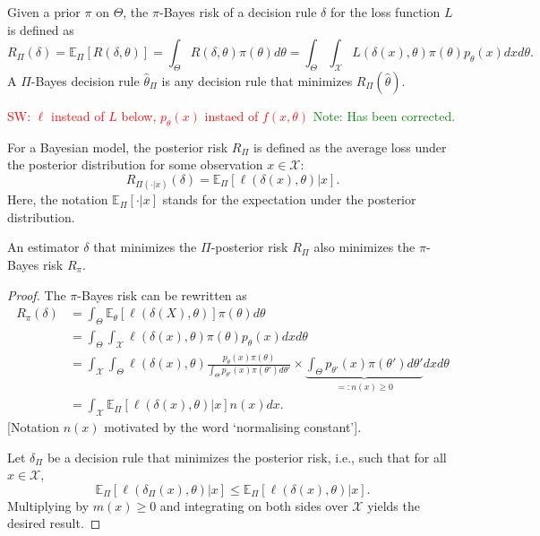 \documentclass[open=any, 11pt,paper=A4]{scrreprt}
\begin{document}
\begin{definition}
    Given a prior $\pi$ on $\Theta$, the $\pi$-Bayes risk of a decision rule $\delta$ for the loss function $L$ is defined as
    \[
    R_\Pi(\delta) = \mathbb{E}_\Pi [R(\delta, \theta)] = \int_{\Theta} R(\delta, \theta) \pi(\theta) d\theta = \int_{\Theta} \int_{\mathcal{X}} L(\delta(x), \theta) \pi(\theta) p_\theta(x) dx d\theta.
    \]
    A $\Pi$-Bayes decision rule $\hat\theta_\Pi$ is any decision rule that minimizes $R_\Pi(\hat\theta)$.
\end{definition}

\textcolor{red}{SW: $\ell$ instead of $L$ below, $p_{\theta}(x)$ instaed of  $f(x, \theta)$ }
\textcolor{green}{Note: Has been corrected. }

\begin{definition}
    For a Bayesian model, the posterior risk $R_{\Pi}$ is defined as the average loss under the posterior distribution for some observation $x \in \mathcal{X}$:
    \[
    R_{\Pi(\cdot|x)}(\delta) = \mathbb{E}_\Pi[\ell(\delta(x), \theta) | x].
    \]
    Here, the notation $\mathbb E_\Pi[\cdot|x]$ stands for the expectation under the posterior distribution.
\end{definition}

\begin{proposition}
    An estimator $\delta$ that minimizes the $\Pi$-posterior risk $R_{\Pi}$ also minimizes the $\pi$-Bayes risk $R_\pi$.
\end{proposition}

\begin{proof}
    The $\pi$-Bayes risk can be rewritten as
\begin{align*}
    R_\pi(\delta) &= \int_{\Theta} \mathbb{E}_\theta[\ell(\delta(X), \theta)] \pi(\theta) d\theta\\
    &= \int_{\Theta} \int_{\mathcal{X}} \ell(\delta(x), \theta) \pi(\theta) p_{\theta}(x) dx d\theta\\
    &= \int_{\mathcal{X}} \int_{\Theta} \ell(\delta(x), \theta) \frac{p_{\theta}(x) \pi(\theta)}{\int_{\Theta} p_{\theta'}(x) \pi(\theta') d\theta'} \times \underbrace{\int_{\Theta} p_{\theta'}(x) \pi(\theta') d\theta'}_{=: n(x) \geq 0} dx d\theta\\
    &= \int_{\mathcal{X}} \mathbb{E}_{\Pi}[\ell(\delta(x), \theta) | x] n(x) dx.
\end{align*}
    [Notation $n(x)$ motivated by the word `normalising constant'].

    
    Let $\delta_\Pi$ be a decision rule that minimizes the posterior risk, i.e., such that for all $x \in \mathcal{X}$,
    \[
    \mathbb{E}_{\Pi}[\ell(\delta_\Pi(x), \theta) | x] \leq \mathbb{E}_{\Pi}[\ell(\delta(x), \theta) | x].
    \]
    Multiplying by $m(x) \geq 0$ and integrating on both sides over $\mathcal{X}$ yields the desired result.
\end{proof}
\end{document}

